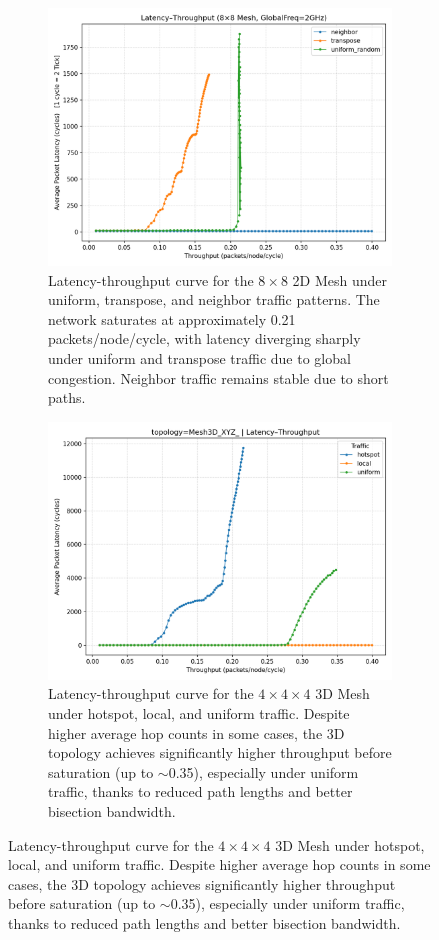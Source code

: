 \documentclass[11pt]{article}
\begin{document}
\begin{figure}[htbp]
    \centering
    \begin{subfigure}[t]{0.45\linewidth}
        \centering
        \includegraphics[width=\linewidth]{./figs/Mesh2D-traffic.png}
        \caption{Latency-throughput curve for the $8{\times}8$ 2D Mesh under uniform, transpose, and neighbor traffic patterns. The network saturates at approximately 0.21 packets/node/cycle, with latency diverging sharply under uniform and transpose traffic due to global congestion. Neighbor traffic remains stable due to short paths.}
        \label{fig:mesh2d-latency-throughput}
    \end{subfigure}
    \hfill
    \begin{subfigure}[t]{0.45\linewidth}
        \centering
        \includegraphics[width=\linewidth]{./figs/Mesh3D-traffic.png}
        \caption{Latency-throughput curve for the $4{\times}4{\times}4$ 3D Mesh under hotspot, local, and uniform traffic. Despite higher average hop counts in some cases, the 3D topology achieves significantly higher throughput before saturation (up to $\sim$0.35), especially under uniform traffic, thanks to reduced path lengths and better bisection bandwidth.}
        \label{fig:mesh3d-latency-throughput}
    \end{subfigure}
    

\end{figure}
\end{document}
